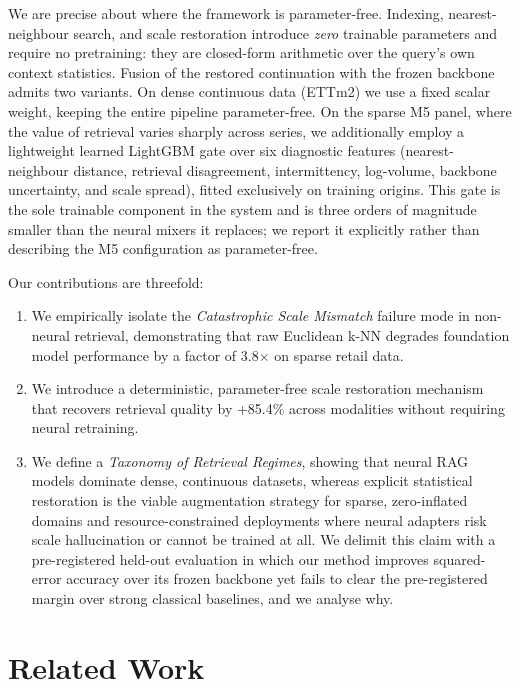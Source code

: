 \documentclass[twocolumn]{svjour3}          %
\begin{document}
We are precise about where the framework is parameter-free. Indexing, nearest-neighbour search, and scale restoration introduce \emph{zero} trainable parameters and require no pretraining: they are closed-form arithmetic over the query's own context statistics. Fusion of the restored continuation with the frozen backbone admits two variants. On dense continuous data (ETTm2) we use a fixed scalar weight, keeping the entire pipeline parameter-free. On the sparse M5 panel, where the value of retrieval varies sharply across series, we additionally employ a lightweight learned LightGBM gate over six diagnostic features (nearest-neighbour distance, retrieval disagreement, intermittency, log-volume, backbone uncertainty, and scale spread), fitted exclusively on training origins. This gate is the sole trainable component in the system and is three orders of magnitude smaller than the neural mixers it replaces; we report it explicitly rather than describing the M5 configuration as parameter-free.

Our contributions are threefold:
\begin{enumerate}
    \item We empirically isolate the \textit{Catastrophic Scale Mismatch} failure mode in non-neural retrieval, demonstrating that raw Euclidean k-NN degrades foundation model performance by a factor of 3.8$\times$ on sparse retail data.
    \item We introduce a deterministic, parameter-free scale restoration mechanism that recovers retrieval quality by +85.4\% across modalities without requiring neural retraining.
    \item We define a \textit{Taxonomy of Retrieval Regimes}, showing that neural RAG models dominate dense, continuous datasets, whereas explicit statistical restoration is the viable augmentation strategy for sparse, zero-inflated domains and resource-constrained deployments where neural adapters risk scale hallucination or cannot be trained at all. We delimit this claim with a pre-registered held-out evaluation in which our method improves squared-error accuracy over its frozen backbone yet fails to clear the pre-registered margin over strong classical baselines, and we analyse why.
\end{enumerate}


\section{Related Work}
\label{sec:related_work}
\end{document}
